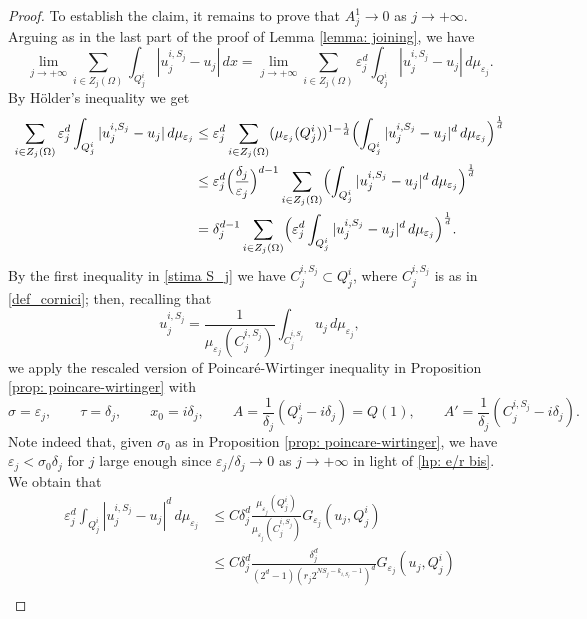 \documentclass{article}
\theoremstyle{plain}
\theoremstyle{definition}
\newcommand{\ej}{\varepsilon_j}
\newcommand{\s}{\sigma}
\newcommand{\dej}{\delta_j}
\numberwithin{equation}{section}
\begin{document}
\begin{proof}
    To establish the claim, it remains to prove that $A^1_j\to 0$ as $j \to +\infty$. Arguing as in the last part of the proof of Lemma \ref{lemma: joining}, we have \begin{equation*}
      \lim_{j\to+\infty} \sum_{i \in Z_j(\Omega)}\int_{Q_j^i}|u^{i,S_j}_j-u_j|\, dx =   \lim_{j\to+\infty}\sum_{i \in Z_j(\Omega)}\ej^d\int_{Q_j^i}|u^{i,S_j}_j-u_j|\, d\mu_{\ej}.
    \end{equation*}
    By H\"older's inequality we get
    \begin{align} \notag
            \sum_{i \in Z_j(\Omega)} \ej^d\int_{Q_j^i}|u^{i,S_j}_j-u_j|\, d\mu_{\ej} & \leq \varepsilon_j^d \sum_{i \in Z_j(\Omega)}(\mu_{\ej}(Q^i_j))^{1-\frac{1}{d}}\Bigl(\int_{Q_j^i}|u^{i,S_j}_j-u_j|^d\, d\mu_{\ej}\Bigr)^{\frac{1}{d}}\\ \notag
            & \leq \varepsilon_j^d\Bigl(\frac{\delta_j}{\varepsilon_j}\Bigr)^{d-1} \sum_{i \in Z_j(\Omega)} \Bigl(\int_{Q_j^i}|u^{i,S_j}_j-u_j|^d\, d\mu_{\ej}\Bigr)^{\frac{1}{d}}\\ \label{integrale 0}
            &=\delta_j^{d-1}\sum_{i \in Z_j(\Omega)} \Bigl(\ej^d\int_{Q^i_j}|u^{i,S_j}_j-u_j|^d\, d\mu_{\ej}\Bigr)^{\frac{1}{d}}.
    \end{align}
By the first inequality in \eqref{stima S_j} we have $C^{i,S_j}_j\subset Q_j^i$, where $C^{i,S_j}_j$ is as in \eqref{def_cornici}; then, recalling that
\begin{equation*}
    u_{j}^{i, S_j}= \frac{1}{\mu_{\ej}(C^{i,S_j}_j)}\int_{C^{i,S_j}_j} u_{j}\, d\mu_{\ej},
\end{equation*}
we apply the rescaled version of Poincaré-Wirtinger inequality in Proposition \ref{prop: poincare-wirtinger} with
\begin{equation*}
   \sigma=\ej, \qquad  \tau=\dej, \qquad x_0=i\dej, \qquad A=\frac{1}{\dej}(Q^i_j-i\dej)=Q(1),  \qquad A'=\frac{1}{\dej}(C^{i,S_j}_j-i\dej).
\end{equation*}
Note indeed that, given $\s_0$ as in Proposition \ref{prop: poincare-wirtinger}, we have $\ej<\sigma_0\dej$ for $j$ large enough since $\ej/\dej\to0$ as $j\to+\infty$ in light of \eqref{hp: e/r bis}. We obtain that
    \begin{align*}
      \ej^d\int_{Q^i_j}|u^{i,S_j}_j-u_j|^d\, d\mu_{\ej} & \leq C\delta_j^d \frac{\mu_{\ej}(Q^i_j)}{\mu_{\ej}(C^{i,S_j}_j)} G_{\varepsilon_j}(u_j,Q^i_j) \\
      & \leq C \dej^d \frac{\dej^d}{(2^d-1)(r_j 2^{NS_j-k_{i,S_j}-1})^d} G_{\varepsilon_j}(u_j,Q^i_j)\\

\end{align*}
\end{proof}
\end{document}
